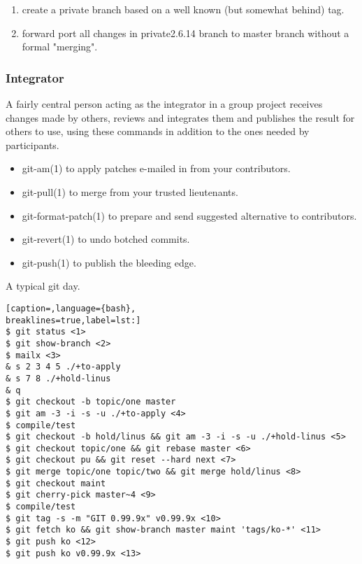 \begin{enumerate}
\setlength{\itemsep}{0cm}
\setlength{\parskip}{0cm}
\item create a private branch based on a well known (but somewhat behind) tag.
\item forward port all changes in private2.6.14 branch to master branch without a formal "merging".
\end{enumerate}

\subsubsection{Integrator}
A fairly central person acting as the integrator in a group project receives
changes made by others, reviews and integrates them and publishes the result
for others to use, using these commands in addition to the ones needed by
participants.
\begin{itemize}
\setlength{\itemsep}{0cm}
\setlength{\parskip}{0cm}
\item git-am(1) to apply patches e-mailed in from your contributors.
\item git-pull(1) to merge from your trusted lieutenants.
\item git-format-patch(1) to prepare and send suggested alternative to contributors.
\item git-revert(1) to undo botched commits.
\item git-push(1) to publish the bleeding edge.
\end{itemize}

A typical git day.
\lstset{basicstyle=\scriptsize, numbers=none, captionpos=b, tabsize=4}
\begin{lstlisting}[caption=,language={bash},
breaklines=true,label=lst:]
$ git status <1>
$ git show-branch <2>
$ mailx <3>
& s 2 3 4 5 ./+to-apply
& s 7 8 ./+hold-linus
& q
$ git checkout -b topic/one master
$ git am -3 -i -s -u ./+to-apply <4>
$ compile/test
$ git checkout -b hold/linus && git am -3 -i -s -u ./+hold-linus <5>
$ git checkout topic/one && git rebase master <6>
$ git checkout pu && git reset --hard next <7>
$ git merge topic/one topic/two && git merge hold/linus <8>
$ git checkout maint
$ git cherry-pick master~4 <9>
$ compile/test
$ git tag -s -m "GIT 0.99.9x" v0.99.9x <10>
$ git fetch ko && git show-branch master maint 'tags/ko-*' <11>
$ git push ko <12>
$ git push ko v0.99.9x <13>
\end{lstlisting}

